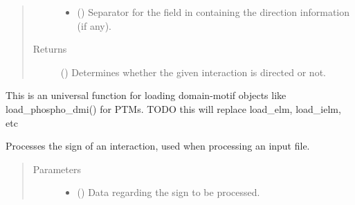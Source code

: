 \documentclass[letterpaper,10pt,english]{sphinxmanual}
\begin{document}
\begin{fulllineitems}
\begin{fulllineitems}
\begin{quote}
\begin{description}
\begin{itemize}
\item {} 
 () \textendash{} Separator for the field in  containing the direction
information (if any).

\end{itemize}

\item[{Returns}] \leavevmode
() \textendash{} Determines whether the given interaction is
directed or not.

\end{description}\end{quote}

\end{fulllineitems}


\begin{fulllineitems}
\label{\detokenize{reference:pypath.main.PyPath.process_directions}}
\end{fulllineitems}


\begin{fulllineitems}
\label{\detokenize{reference:pypath.main.PyPath.process_dmi}}
This is an universal function
for loading domain-motif objects
like load\_phospho\_dmi() for PTMs.
TODO this will replace load\_elm, load\_ielm, etc

\end{fulllineitems}


\begin{fulllineitems}
\label{\detokenize{reference:pypath.main.PyPath.process_sign}}
Processes the sign of an interaction, used when processing an
input file.
\begin{quote}\begin{description}
\item[{Parameters}] \leavevmode\begin{itemize}
\item {} 
 () \textendash{} Data regarding the sign to be processed.


\end{itemize}
\end{description}
\end{quote}
\end{fulllineitems}
\end{fulllineitems}
\end{document}
